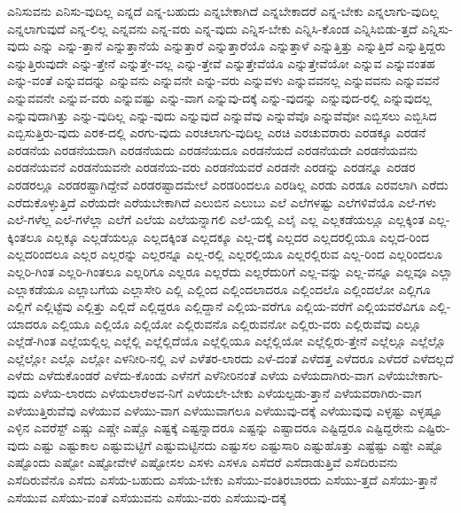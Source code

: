 {ಎನಿಸುವನು
ಎನಿಸು-ವುದಿಲ್ಲ
ಎನ್ನದೆ
ಎನ್ನ-ಬಹುದು
ಎನ್ನಬೇಕಾಗಿದೆ
ಎನ್ನಬೇಕಾದರೆ
ಎನ್ನ-ಬೇಕು
ಎನ್ನಲಾಗು-ವುದಿಲ್ಲ
ಎನ್ನಲಾಗುವುದೆ
ಎನ್ನ-ಲಿಲ್ಲ
ಎನ್ನವನು
ಎನ್ನ-ವರು
ಎನ್ನ-ವುದು
ಎನ್ನಿಸ-ಬೇಕು
ಎನ್ನಿಸಿ-ಕೊಂಡ
ಎನ್ನಿಸಿಬಿಡು-ತ್ತದೆ
ಎನ್ನಿಸು-ವುದು
ಎನ್ನು
ಎನ್ನು-ತ್ತಾನೆ
ಎನ್ನುತ್ತಾನೆಯೆ
ಎನ್ನುತ್ತಾರೆ
ಎನ್ನುತ್ತಾರೆಯೊ
ಎನ್ನುತ್ತಾಳೆ
ಎನ್ನುತ್ತಿತ್ತು
ಎನ್ನುತ್ತಿದೆ
ಎನ್ನುತ್ತಿದ್ದರು
ಎನ್ನುತ್ತಿರುವುದೇ
ಎನ್ನು-ತ್ತೇನೆ
ಎನ್ನುತ್ತೇ-ವಲ್ಲ
ಎನ್ನು-ತ್ತೇವೆ
ಎನ್ನುತ್ತೇವೆಯೊ
ಎನ್ನುತ್ತೇವೆಯೋ
ಎನ್ನುವ
ಎನ್ನುವಂತಹ
ಎನ್ನು-ವಂತೆ
ಎನ್ನುವದನ್ನು
ಎನ್ನುವನು
ಎನ್ನುವನೇ
ಎನ್ನು-ವರು
ಎನ್ನುವಳು
ಎನ್ನುವವನಲ್ಲ
ಎನ್ನುವವನು
ಎನ್ನುವವನೆ
ಎನ್ನುವವನೇ
ಎನ್ನುವ-ವರು
ಎನ್ನುವಷ್ಟು
ಎನ್ನು-ವಾಗ
ಎನ್ನುವು-ದಕ್ಕೆ
ಎನ್ನು-ವುದನ್ನು
ಎನ್ನುವುದ-ರಲ್ಲಿ
ಎನ್ನುವುದಲ್ಲ
ಎನ್ನುವುದಾಗಿತ್ತು
ಎನ್ನು-ವುದಿಲ್ಲ
ಎನ್ನು-ವುದು
ಎನ್ನುವುದೆ
ಎನ್ನುವೆವು
ಎನ್ನುವೆವೊ
ಎನ್ನುವೆವೋ
ಎಬ್ಬಿಸಲು
ಎಬ್ಬಿಸಿದ
ಎಬ್ಬಿಸುತ್ತಿರು-ವುದು
ಎರಕ-ದಲ್ಲಿ
ಎರಗು-ವುದು
ಎರಚಲಾಗು-ವುದಿಲ್ಲ
ಎರಚಿ
ಎರಚುವರಾರು
ಎರಡಕ್ಕೂ
ಎರಡನೆ
ಎರಡನೆಯ
ಎರಡನೆಯದಾಗಿ
ಎರಡನೆಯದು
ಎರಡನೆಯದೂ
ಎರಡನೆಯದೆ
ಎರಡನೆಯದೇ
ಎರಡನೆಯವನು
ಎರಡನೆಯವನೆ
ಎರಡನೆಯವನೇ
ಎರಡನೆಯ-ವರು
ಎರಡನೆಯವರೆ
ಎರಡನೇ
ಎರಡನ್ನು
ಎರಡನ್ನೂ
ಎರಡರ
ಎರಡರಲ್ಲೂ
ಎರಡರಷ್ಟಾಗಿದ್ದೇವೆ
ಎರಡರಷ್ಟಾದಮೇಲೆ
ಎರಡರಿಂದಲೂ
ಎರಡಿಲ್ಲ
ಎರಡು
ಎರಡೂ
ಎರವಲಾಗಿ
ಎರೆದು
ಎರೆದುಕೊಳ್ಳುತ್ತಿದೆ
ಎರೆಯದೇ
ಎರೆಯಬೇಕಾಗಿದೆ
ಎಲುಬಿನ
ಎಲುಬು
ಎಲೆ
ಎಲೆಗಳಷ್ಟು
ಎಲೆಗಳಿವೆಯೊ
ಎಲೆ-ಗಳು
ಎಲೆ-ಗಳೆಲ್ಲ
ಎಲೆ-ಗಳೆಲ್ಲಾ
ಎಲೆಗೆ
ಎಲೆಯ
ಎಲೆಯನ್ನಾಗಲಿ
ಎಲೆ-ಯಲ್ಲಿ
ಎಲೈ
ಎಲ್ಲ
ಎಲ್ಲಕಡೆಯಲ್ಲೂ
ಎಲ್ಲಕ್ಕಿಂತ
ಎಲ್ಲ-ಕ್ಕಿಂತಲೂ
ಎಲ್ಲಕ್ಕೂ
ಎಲ್ಲಡೆಯಲ್ಲೂ
ಎಲ್ಲದಕ್ಕಿಂತ
ಎಲ್ಲದಕ್ಕೂ
ಎಲ್ಲ-ದಕ್ಕೆ
ಎಲ್ಲದರ
ಎಲ್ಲದರಲ್ಲಿಯೂ
ಎಲ್ಲದ-ರಿಂದ
ಎಲ್ಲದರಿಂದಲೂ
ಎಲ್ಲರ
ಎಲ್ಲರನ್ನು
ಎಲ್ಲರನ್ನೂ
ಎಲ್ಲ-ರಲ್ಲಿ
ಎಲ್ಲರಲ್ಲಿಯೂ
ಎಲ್ಲರಲ್ಲಿರುವ
ಎಲ್ಲ-ರಿಂದ
ಎಲ್ಲರಿಂದಲೂ
ಎಲ್ಲರಿ-ಗಿಂತ
ಎಲ್ಲರಿ-ಗಿಂತಲೂ
ಎಲ್ಲರಿಗೂ
ಎಲ್ಲರೂ
ಎಲ್ಲರೆದು
ಎಲ್ಲರೆದುರಿಗೆ
ಎಲ್ಲ-ವನ್ನು
ಎಲ್ಲ-ವನ್ನೂ
ಎಲ್ಲವೂ
ಎಲ್ಲಾ
ಎಲ್ಲಾಕಡೆಯೂ
ಎಲ್ಲಾಬಗೆಯ
ಎಲ್ಲಾಸೇರಿ
ಎಲ್ಲಿ
ಎಲ್ಲಿಂದ
ಎಲ್ಲಿಂದಲಾದರೂ
ಎಲ್ಲಿಂದಲೊ
ಎಲ್ಲಿಂದಲೋ
ಎಲ್ಲಿಗೂ
ಎಲ್ಲಿಗೆ
ಎಲ್ಲಿಟ್ಟೆವು
ಎಲ್ಲಿತ್ತು
ಎಲ್ಲಿದೆ
ಎಲ್ಲಿದ್ದರೂ
ಎಲ್ಲಿದ್ದಾನೆ
ಎಲ್ಲಿಯ-ವರೆಗೂ
ಎಲ್ಲಿಯ-ವರೆಗೆ
ಎಲ್ಲಿಯವರೆವಿಗೂ
ಎಲ್ಲಿ-ಯಾದರೂ
ಎಲ್ಲಿಯೂ
ಎಲ್ಲಿಯೊ
ಎಲ್ಲಿಯೋ
ಎಲ್ಲಿರುವನೊ
ಎಲ್ಲಿರುವನೋ
ಎಲ್ಲಿರು-ವರು
ಎಲ್ಲಿರುವೆವು
ಎಲ್ಲೂ
ಎಲ್ಲೆಡೆ-ಗಿಂತ
ಎಲ್ಲೆಯಲ್ಲಿಲ್ಲ
ಎಲ್ಲೆಲ್ಲಿ
ಎಲ್ಲೆಲ್ಲಿದೆಯೊ
ಎಲ್ಲೆಲ್ಲಿಯೂ
ಎಲ್ಲೆಲ್ಲಿಯೋ
ಎಲ್ಲೆಲ್ಲಿರು-ತ್ತೇನೆ
ಎಲ್ಲೆಲ್ಲೂ
ಎಲ್ಲೆಲ್ಲೊ
ಎಲ್ಲೆಲ್ಲೋ
ಎಲ್ಲೊ
ಎಲ್ಲೋ
ಎಳನೀರಿ-ನಲ್ಲಿ
ಎಳೆ
ಎಳೆತರ-ಲಾರದು
ಎಳೆ-ದಂತೆ
ಎಳೆದತ್ತ
ಎಳೆದರೂ
ಎಳೆದರೆ
ಎಳೆದಲ್ಲದೆ
ಎಳೆದು
ಎಳೆದುಕೊಂಡರೆ
ಎಳೆದು-ಕೊಂಡು
ಎಳೆನಗೆ
ಎಳೆನೀರಿನಂತೆ
ಎಳೆಯ
ಎಳೆಯದಾಗಿರು-ವಾಗ
ಎಳೆಯಬೇಕಾಗು-ವುದು
ಎಳೆಯ-ಲಾರದು
ಎಳೆಯಲಾರೆಅವ-ನಿಗೆ
ಎಳೆಯಲೇ-ಬೇಕು
ಎಳೆಯಲ್ಪಡು-ತ್ತಾನೆ
ಎಳೆಯವರಾಗಿರು-ವಾಗ
ಎಳೆಯುತ್ತಿರುವೆವು
ಎಳೆಯುವ
ಎಳೆಯು-ವಾಗ
ಎಳೆಯುವಾಗಲೂ
ಎಳೆಯುವು-ದಕ್ಕೆ
ಎಳೆಯುವುವು
ಎಳ್ಳಷ್ಟು
ಎಳ್ಳಷ್ಟೂ
ಎಳ್ಳಿನ
ಎವರೆಸ್ಟ್
ಎಷ್ಚು
ಎಷ್ಚೇ
ಎಷ್ಚೊ
ಎಷ್ಟಕ್ಕೆ
ಎಷ್ಟನ್ನಾದರೂ
ಎಷ್ಟನ್ನು
ಎಷ್ಟಾದರೂ
ಎಷ್ಟಿದ್ದರೂ
ಎಷ್ಟಿದ್ದರೇನು
ಎಷ್ಟಿರು-ವುದು
ಎಷ್ಟು
ಎಷ್ಟುಕಾಲ
ಎಷ್ಟುಮಟ್ಟಿಗೆ
ಎಷ್ಟುಮಟ್ಟಿನದು
ಎಷ್ಟುಸಲ
ಎಷ್ಟುಸಾರಿ
ಎಷ್ಟುಹೊತ್ತು
ಎಷ್ಟೆಷ್ಟು
ಎಷ್ಟೇ
ಎಷ್ಟೊ
ಎಷ್ಟೊಂದು
ಎಷ್ಟೋ
ಎಷ್ಟೋವೇಳೆ
ಎಷ್ಟೋಸಲ
ಎಸಳು
ಎಸಳೂ
ಎಸೆದರೆ
ಎಸೆದಾಡುತ್ತಿವೆ
ಎಸೆದಿರುವನು
ಎಸೆದಿರುವೆನೊ
ಎಸೆದು
ಎಸೆಯ-ಬಹುದು
ಎಸೆಯ-ಬೇಕು
ಎಸೆಯು-ವಂತಿರಬಾರದು
ಎಸೆಯು-ತ್ತದೆ
ಎಸೆಯು-ತ್ತಾನೆ
ಎಸೆಯುವ
ಎಸೆಯು-ವಂತೆ
ಎಸೆಯುವನು
ಎಸೆಯು-ವರು
ಎಸೆಯುವು-ದಕ್ಕೆ
}

